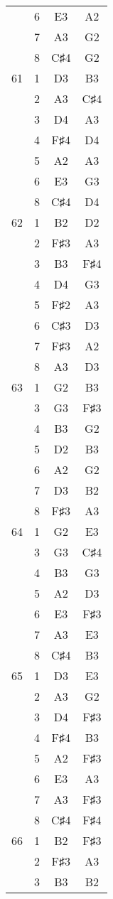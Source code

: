 \documentclass{article}
\begin{document}
\begin{longtable}{|c|c|c|c|}
  & 6 & E3 & A2 \\ 
  & 7 & A3 & G2 \\ 
  & 8 & C♯4 & G2 \\ 
\hline
61 & 1 & D3 & B3 \\ 
  & 2 & A3 & C♯4 \\ 
  & 3 & D4 & A3 \\ 
  & 4 & F♯4 & D4 \\ 
  & 5 & A2 & A3 \\ 
  & 6 & E3 & G3 \\ 
  & 8 & C♯4 & D4 \\ 
\hline
62 & 1 & B2 & D2 \\ 
  & 2 & F♯3 & A3 \\ 
  & 3 & B3 & F♯4 \\ 
  & 4 & D4 & G3 \\ 
  & 5 & F♯2 & A3 \\ 
  & 6 & C♯3 & D3 \\ 
  & 7 & F♯3 & A2 \\ 
  & 8 & A3 & D3 \\ 
\hline
63 & 1 & G2 & B3 \\ 
  & 3 & G3 & F♯3 \\ 
  & 4 & B3 & G2 \\ 
  & 5 & D2 & B3 \\ 
  & 6 & A2 & G2 \\ 
  & 7 & D3 & B2 \\ 
  & 8 & F♯3 & A3 \\ 
\hline
64 & 1 & G2 & E3 \\ 
  & 3 & G3 & C♯4 \\ 
  & 4 & B3 & G3 \\ 
  & 5 & A2 & D3 \\ 
  & 6 & E3 & F♯3 \\ 
  & 7 & A3 & E3 \\ 
  & 8 & C♯4 & B3 \\ 
\hline
65 & 1 & D3 & E3 \\ 
  & 2 & A3 & G2 \\ 
  & 3 & D4 & F♯3 \\ 
  & 4 & F♯4 & B3 \\ 
  & 5 & A2 & F♯3 \\ 
  & 6 & E3 & A3 \\ 
  & 7 & A3 & F♯3 \\ 
  & 8 & C♯4 & F♯4 \\ 
\hline
66 & 1 & B2 & F♯3 \\ 
  & 2 & F♯3 & A3 \\ 
  & 3 & B3 & B2 \\ 

\end{longtable}
\end{document}
